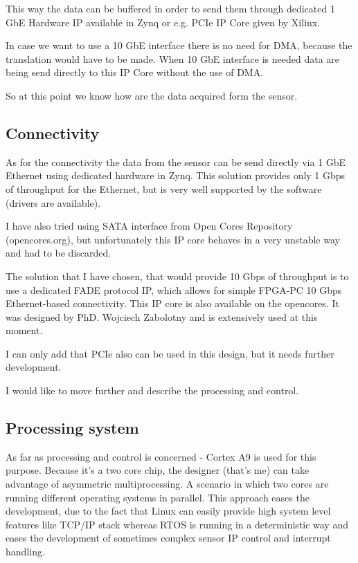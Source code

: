 \documentclass[10pt,a4paper]{article}
\begin{document}
This way the data can be buffered in order to send them through dedicated 1 GbE Hardware IP available in Zynq or e.g. PCIe IP Core given by Xilinx. 

In case we want to use a 10 GbE interface there is no need for DMA, because the translation would have to be made. When 10 GbE interface is needed data are being send directly to this IP Core without the use of DMA.  

So at this point we know how are the data acquired form the sensor.


\subsection{Connectivity}
As for the connectivity the data from the sensor can be send directly via 1 GbE Ethernet using dedicated hardware in Zynq. This solution provides only 1 Gbps of throughput for the Ethernet, but is very well supported by the software (drivers are available).

I have also tried using SATA interface from Open Cores Repository (opencores.org), but unfortunately this IP core behaves in a very unstable way and had to be discarded. 

The solution that I have chosen, that would provide 10 Gbps of throughput is to use a dedicated FADE protocol IP, which allows for simple FPGA-PC 10 Gbps Ethernet-based connectivity. This IP core is also available on the opencores. It was designed by PhD. Wojciech Zabolotny and is extensively used at this moment.  

I can only add that PCIe also can be used in this design, but it needs further development.

 I would like to move further and describe the processing and control. 

\subsection{Processing system}
 As far as processing and control is concerned - Cortex A9 is used for this purpose. Because it's a two core chip, the designer (that's me) can take advantage of asymmetric multiprocessing. A scenario in which two cores are running different operating systems in parallel. This approach eases the development, due to the fact that Linux can easily provide high system level features like TCP/IP stack whereas RTOS is running in a deterministic way and eases the development of sometimes complex sensor IP control and interrupt handling.
\end{document}
